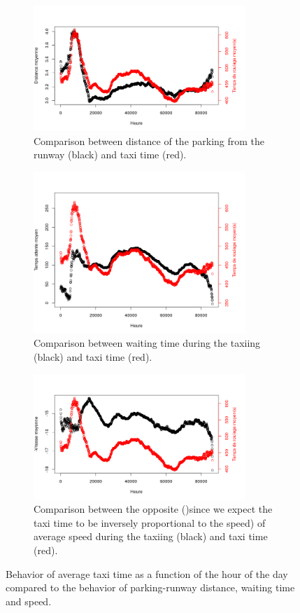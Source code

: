 \documentclass{article}
\begin{document}
	\begin{figure}[h!!!!!!!!!]
		\centering
		\begin{subfigure}[b]{\textwidth}
		\centering
		\includegraphics[width=8cm]{Distance_TempsRoulage}
		\caption{Comparison between distance of the parking from the runway (black) and taxi time (red).}
		\label{distance}
		\end{subfigure}
		\begin{subfigure}[b]{\textwidth}
			\centering
		\includegraphics[width=8cm]{temps_attente_TempsRoulage}
		\caption{Comparison between waiting time during the taxiing (black) and taxi time (red).}
		\label{waiting}
		\end{subfigure}
		\begin{subfigure}[b]{\textwidth}
		\centering
		\includegraphics[width=8cm]{vitesse_TempsRoulage}
		\caption{Comparison between the opposite ()since we expect the taxi time to be inversely proportional to the speed) of average speed during the taxiing (black) and taxi time (red).}
		\label{vitesse}
		\end{subfigure}
	\caption{Behavior of average taxi time as a function of the hour of the day compared to the behavior of parking-runway distance, waiting time and speed.}
	\label{comparisons}
	\end{figure}
\end{document}
